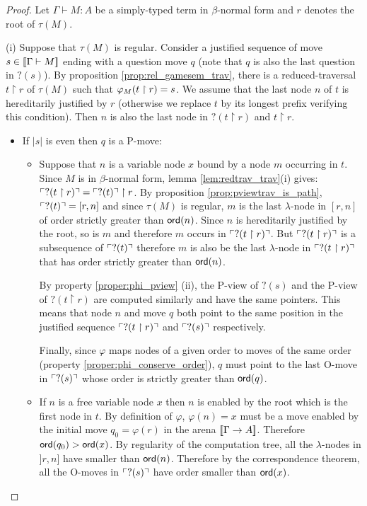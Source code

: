 \begin{proof}
Let $\Gamma \vdash M : A$ be a simply-typed term in $\beta$-normal form
and $r$ denotes the root of $\tau(M)$.

\noindent %
(i) Suppose that $\tau(M)$ is regular.
Consider a justified sequence of move $s \in {[\![\Gamma \vdash M ]\!]}$
ending with a question move $q$ (note that $q$ is also the last question in $?(s)$).
By proposition \ref{prop:rel_gamesem_trav}, there
is a reduced-traversal $t \upharpoonright r$ of $\tau(M)$ such that $\varphi_{M}(t \upharpoonright r) = s$.
We assume that the last node $n$ of $t$ is hereditarily justified by $r$ (otherwise we replace $t$ by its longest prefix verifying this condition).
Then $n$ is also the last node in $?(t \upharpoonright r)$ and $t \upharpoonright r$.

\begin{itemize}
\item If $|s|$ is even then $q$ is a P-move:
\begin{itemize}
\item Suppose that $n$ is a variable node $x$ bound by a node $m$ occurring in $t$.
Since $M$ is in $\beta$-normal form, lemma \ref{lem:redtrav_trav}(i) gives:
$ \ulcorner ?(t \upharpoonright r) \urcorner = \ulcorner ?(t) \urcorner \upharpoonright  r$.
By proposition \ref{prop:pviewtrav_is_path}, $\ulcorner ?(t) \urcorner = [r,n]$ and since
$\tau(M)$ is regular, $m$ is the last $\lambda$-node in $[r,n]$ of order strictly greater than ${\sf ord}(n)$.
Since $n$ is hereditarily justified by the root, so is $m$ and therefore $m$ occurs in $\ulcorner ?(t \upharpoonright r) \urcorner$.
But $\ulcorner ?(t \upharpoonright r) \urcorner$ is a subsequence of $\ulcorner ?(t) \urcorner$ therefore $m$ is also be the last $\lambda$-node
in $\ulcorner ?(t \upharpoonright  r) \urcorner$ that has order strictly greater than ${\sf ord}(n)$.

By property \ref{proper:phi_pview} (ii), the P-view of $?(s)$ and the P-view of $?(t \upharpoonright r)$ are computed
similarly and have the same pointers. This means that
node $n$ and  move $q$ both point to the same position in
the justified sequence $\ulcorner ?(t\upharpoonright r) \urcorner$ and $\ulcorner ?(s) \urcorner$ respectively.

Finally, since $\varphi$ maps nodes of a given order to moves of the same order (property \ref{proper:phi_conserve_order}),
$q$ must point to the last O-move in $\ulcorner ?(s) \urcorner$ whose
order is strictly greater than ${\sf ord}(q)$.


\item If $n$ is a free variable node $x$ then $n$ is enabled by the root which is the first node in $t$.
By definition of $\varphi$, $\varphi(n) = x$ must be a move enabled by the initial move $q_0 = \varphi(r)$ in the arena ${[\![ \Gamma \rightarrow A ]\!]}$.
Therefore ${\sf ord}(q_0) > {\sf ord}(x)$.
By regularity of the computation tree, all the $\lambda$-nodes in $]r,n]$ have smaller than ${\sf ord}(n)$. Therefore by the correspondence theorem,
all the O-moves in $\ulcorner ?(s) \urcorner$ have order smaller than ${\sf ord}(x)$.
\end{itemize}




\end{itemize}
\end{proof}
